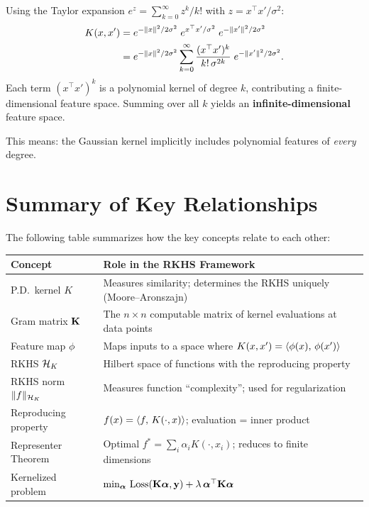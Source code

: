 \begin{notechapter}
\begin{insightbox}
Using the Taylor expansion $e^z = \sum_{k=0}^\infty z^k/k!$ with $z =
x^\top x' / \sigma^2$:
\begin{align*}
K(x,x') &= e^{-\| x \|^2/2\sigma^2}\; e^{x^\top x'/\sigma^2}\; e^{-\| x' \|^2/2\sigma^2} \\
&= e^{-\| x \|^2/2\sigma^2} \sum_{k=0}^\infty \frac{(x^\top x')^k}{k!\,\sigma^{2k}}\; e^{-\| x' \|^2/2\sigma^2}.
\end{align*}
Each term $(x^\top x')^k$ is a polynomial kernel of degree $k$,
contributing a finite-dimensional feature space. Summing over all $k$
yields an \textbf{infinite-dimensional} feature space.

This means: the Gaussian kernel implicitly includes polynomial features
of \emph{every} degree.
\end{insightbox}

\section{Summary of Key Relationships}
\label{rkhs:sec:summary}

The following table summarizes how the key concepts relate to each other:

\begin{center}
\renewcommand{\arraystretch}{1.4}
\begin{tabular}{@{}p{4cm}p{9.5cm}@{}}
\toprule
\textbf{Concept} & \textbf{Role in the RKHS Framework} \\
\midrule
P.D.\ kernel $K$ & Measures similarity; determines the RKHS uniquely
(Moore--Aronszajn) \\
Gram matrix $\mathbf{K}$ & The $n \times n$ computable matrix of kernel
evaluations at data points \\
Feature map $\phi$ & Maps inputs to a space where $K(x,x') =
\langle \phi(x),\, \phi(x') \rangle$ \\
RKHS $\mathcal{H}_K$ & Hilbert space of functions with the reproducing property \\
RKHS norm $\| f \|_{\mathcal{H}_K}$ & Measures function ``complexity''; used for
regularization \\
Reproducing property & $f(x) = \langle f,\, K(\cdot,x) \rangle$; evaluation =
inner product \\
Representer Theorem & Optimal $f^* = \sum_i \alpha_i K(\cdot, x_i)$;
reduces to finite dimensions \\
Kernelized problem & $\min_{\boldsymbol{\alpha}}
\,\mathrm{Loss}(\mathbf{K}\boldsymbol{\alpha}, \mathbf{y}) +
\lambda\,\boldsymbol{\alpha}^\top\mathbf{K}\boldsymbol{\alpha}$ \\
\bottomrule
\end{tabular}
\end{center}


\end{notechapter}
